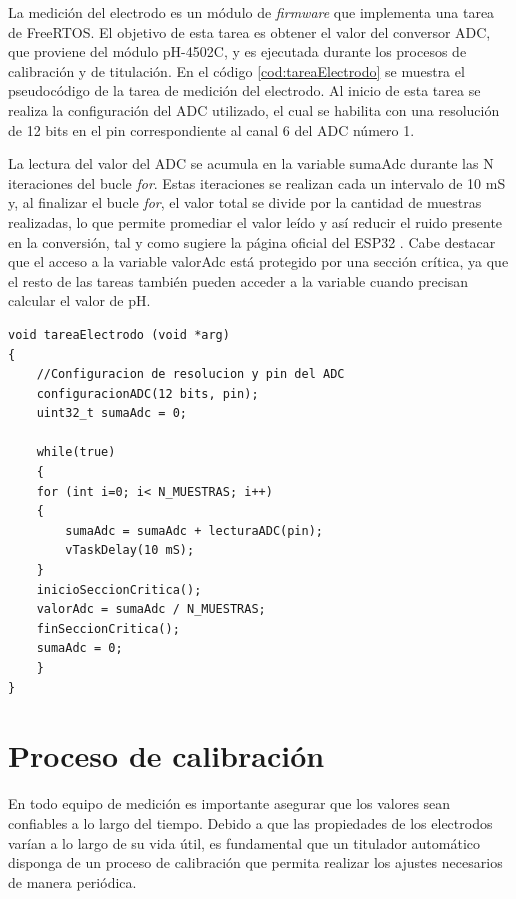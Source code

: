 La medición del electrodo es un módulo de \textit{firmware} que implementa una tarea de FreeRTOS. El objetivo de esta tarea es obtener el valor del conversor ADC, que proviene del módulo pH-4502C, y es ejecutada durante los procesos de calibración y de titulación. En el código \ref{cod:tareaElectrodo} se muestra el pseudocódigo de la tarea de medición del electrodo. Al inicio de esta tarea se realiza la configuración del ADC utilizado, el cual se habilita con una resolución de 12 bits en el pin correspondiente al canal 6 del ADC número 1.

La lectura del valor del ADC se acumula en la variable sumaAdc durante las N iteraciones del bucle \textit{for}. Estas iteraciones se realizan cada un intervalo de 10 mS y, al finalizar el bucle \textit{for}, el valor total se divide por la cantidad de muestras realizadas, lo que permite promediar el valor leído y así reducir el ruido presente en la conversión, tal y como sugiere la página oficial del ESP32 \citep{WEBSITE:2}. Cabe destacar que el acceso a la variable valorAdc está protegido por una sección crítica, ya que el resto de las tareas también pueden acceder a la variable cuando precisan calcular el valor de pH.

\begin{lstlisting}[label=cod:tareaElectrodo,caption=Pseudocódigo de la tarea de medición de pH.]
void tareaElectrodo (void *arg)
{
    //Configuracion de resolucion y pin del ADC
    configuracionADC(12 bits, pin);
    uint32_t sumaAdc = 0;

    while(true)
    {
    for (int i=0; i< N_MUESTRAS; i++)
    {
        sumaAdc = sumaAdc + lecturaADC(pin);  
        vTaskDelay(10 mS);
    } 
    inicioSeccionCritica(); 
    valorAdc = sumaAdc / N_MUESTRAS;
    finSeccionCritica();
    sumaAdc = 0;
    }
}
\end{lstlisting}

\section{Proceso de calibración}

En todo equipo de medición es importante asegurar que los valores sean confiables a lo largo del tiempo. Debido a que las propiedades de los electrodos varían a lo largo de su vida útil, es fundamental que un titulador automático disponga de un proceso de calibración que permita realizar los ajustes necesarios de manera periódica.

